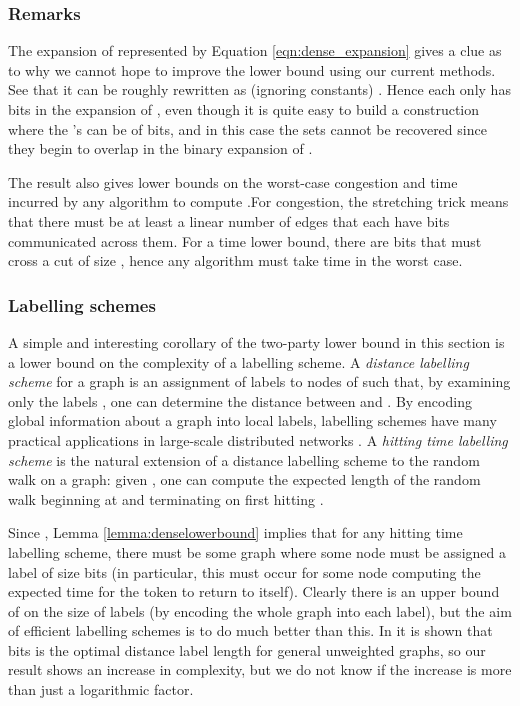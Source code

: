 \documentclass[twocolumn]{article}
\begin{document}
\subsubsection{Remarks}
The expansion of  represented by Equation \ref{eqn:dense_expansion} gives a clue as to why we cannot hope to improve the lower bound using our current methods. See that it can be roughly rewritten as (ignoring constants) . Hence each  only has  bits in the expansion of , even though it is quite easy to build a construction where the 's can be of  bits, and in this case the sets cannot be recovered since they begin to overlap in the binary expansion of .

The result also gives lower bounds on the worst-case congestion and time incurred by any algorithm to compute .For congestion, the stretching trick means that there must be at least a linear number of edges that each have  bits communicated across them. For a time lower bound, there are  bits that must cross a cut of size , hence any algorithm must take time  in the worst case.

\subsubsection{Labelling schemes}

A simple and interesting corollary of the two-party lower bound in this section is a lower bound on the complexity of a labelling scheme. A {\em distance labelling scheme} for a graph  is an assignment of labels  to nodes  of  such that, by examining only the labels , one can determine the distance  between  and . By encoding global information about a graph into local labels, labelling schemes have many practical applications in large-scale distributed networks \cite{gavoille01distance}. A {\em hitting time labelling scheme} is the natural extension of a distance labelling scheme to the random walk on a graph: given , one can compute the expected length  of the random walk beginning at  and terminating on first hitting .

Since , Lemma \ref{lemma:denselowerbound} implies that for any hitting time labelling scheme, there must be some graph where some node must be assigned a label of size  bits (in particular, this must occur for some node computing the expected time for the token to return to itself). Clearly there is an upper bound of  on the size of labels (by encoding the whole graph into each label), but the aim of efficient labelling schemes is to do much better than this. In \cite{gavoille01distance} it is shown that  bits is the optimal distance label length for general unweighted graphs, so our result shows an increase in complexity, but we do not know if the increase is more than just a logarithmic factor.
\end{document}
